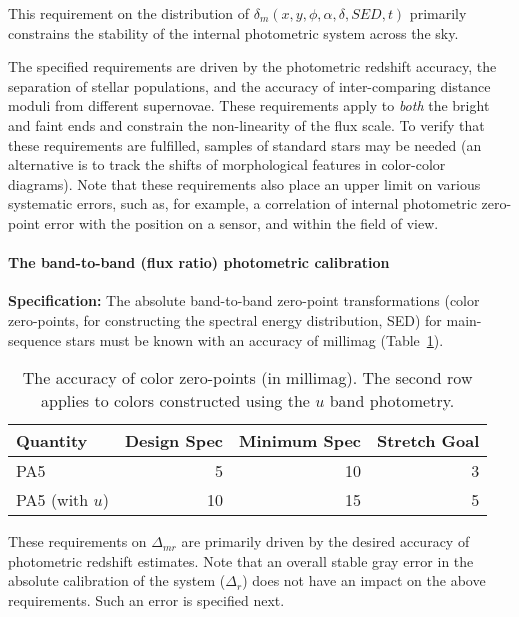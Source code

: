 This requirement on the distribution of $\delta_m(x,y,\phi,\alpha,\delta,SED,t)$
primarily constrains the stability of the internal photometric system
across the sky.

The specified requirements are driven by the photometric redshift accuracy,
the separation of stellar populations, and the accuracy of inter-comparing
distance moduli from different supernovae. These requirements apply
to \textit{both} the bright and faint ends and constrain the non-linearity of the
flux scale. To verify that these requirements are
fulfilled, samples of standard stars may be needed (an alternative is to
track the shifts of morphological features in color-color diagrams).
Note that these requirements also place an upper limit on various systematic
errors, such as, for example, a correlation of internal photometric
zero-point error with the position on a sensor, and within the field of
view.


\paragraph{The band-to-band (flux ratio) photometric calibration\\}

\textbf{Specification:} The absolute band-to-band zero-point transformations
(color zero-points, \eg for constructing the spectral energy distribution,
SED) for main-sequence stars must be known with an accuracy of
millimag (Table~\ref{TcolorOffsets}).

\begin{table}[h]
\begin{tabular}{|l|r|r|r|}
\hline
              Quantity   & Design Spec & Minimum Spec & Stretch Goal   \\
\hline
      PA5                &       5     &       10     &    3            \\
      PA5 (with $u$)     &      10     &       15     &    5            \\
\hline
\end{tabular}
\caption{The accuracy of color zero-points (in millimag). The second row
applies to colors constructed using the $u$ band photometry.}
\label{TcolorOffsets}
\end{table}

These requirements on $\Delta_{mr}$ are primarily driven by the desired accuracy of
photometric redshift estimates. Note that an overall stable gray error in
the absolute calibration of the system ($\Delta_r$) does not have an impact
on the above requirements. Such an error is specified next.



